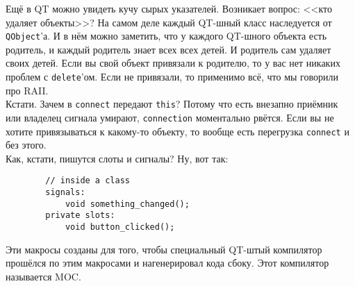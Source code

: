 \documentclass{article}
\begin{document}
    Ещё в QT можно увидеть кучу сырых указателей. Возникает вопрос: <<кто удаляет объекты>>? На самом деле каждый QT-шный класс наследуется от \texttt{QObject}'а. И в нём можно заметить, что у каждого QT-шного объекта есть родитель, и каждый родитель знает всех всех детей. И родитель сам удаляет своих детей. Если вы свой объект привязали к родителю, то у вас нет никаких проблем с \texttt{delete}'ом. Если не привязали, то применимо всё, что мы говорили про RAII.\\
    Кстати. Зачем в \texttt{connect} передают \texttt{this}? Потому что есть внезапно приёмник или владелец сигнала умирают, \texttt{connection} моментально рвётся. Если вы не хотите привязываться к какому-то объекту, то вообще есть перегрузка \texttt{connect} и без этого.\\
    Как, кстати, пишутся слоты и сигналы? Ну, вот так:
    \begin{verbatim}
        // inside a class
        signals:
            void something_changed();
        private slots:
            void button_clicked();
    \end{verbatim}
    Эти макросы созданы для того, чтобы специальный QT-штый компилятор прошёлся по этим макросами и нагенерировал кода сбоку. Этот компилятор называется MOC.
\end{document}
